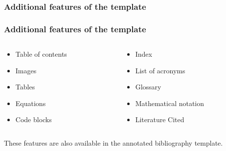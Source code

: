 \documentclass[aspectratio=169]{beamer}
\begin{document}
\subsubsection{Additional features of the template}
\begin{frame}
\frametitle{Additional features of the template}
\Large{
\begin{columns}
    \begin{column}{0.45\textwidth}

        \begin{itemize}[font=$\bullet$\scshape\bfseries]
            \item Table of contents
            \item Images
            \item Tables
            \item Equations
            \item Code blocks
        \end{itemize}
    \end{column}
    \begin{column}{0.45\textwidth}
        \begin{itemize}[font=$\bullet$\scshape\bfseries]
            \item Index
            \item List of acronyms
            \item Glossary
            \item Mathematical notation
            \item Literature Cited
        \end{itemize}
    \end{column}
    \end{columns}
    \vspace{2em}
    These features are also available in the annotated bibliography template.
    }
\end{frame}
\end{document}
